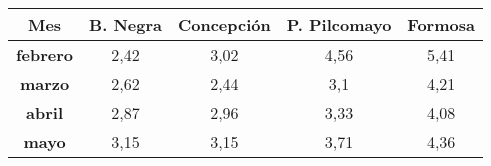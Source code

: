 \begin{tabular}{|c|c|c|c|c|}
\hline
\textbf{Mes} & \textbf{B. Negra} & \textbf{Concepción} & \textbf{P. Pilcomayo} & \textbf{Formosa} \\
\hline
\textbf{febrero} & 2,42 & 3,02 & 4,56 & 5,41 \\
\hline
\textbf{marzo} & 2,62 & 2,44 & 3,1 & 4,21 \\
\hline
\textbf{abril} & 2,87 & 2,96 & 3,33 & 4,08 \\
\hline
\textbf{mayo} & 3,15 & 3,15 & 3,71 & 4,36 \\
\hline
\end{tabular}